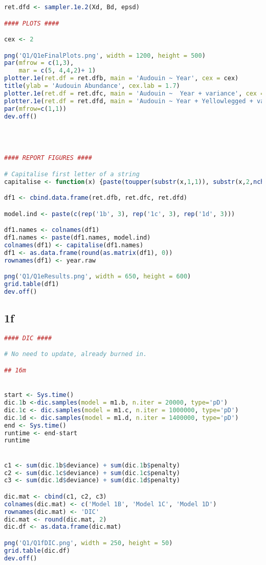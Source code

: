 \documentclass[11pt]{article}
\begin{document}
\begin{lstlisting}[language=R]
ret.dfd <- sampler.1e.2(Xd, Bd, epsd)  

#### PLOTS ####

cex <- 2

png('Q1/Q1eFinalPlots.png', width = 1200, height = 500)
par(mfrow = c(1,3), 
    mar = c(5, 4,4,2)+ 1)
plotter.1e(ret.df = ret.dfb, main = 'Audouin ~ Year', cex = cex)
title(ylab = 'Audouin Abundance', cex.lab = 1.7)
plotter.1e(ret.df = ret.dfc, main = 'Audouin ~  Year + variance', cex = cex)
plotter.1e(ret.df = ret.dfd, main = 'Audouin ~ Year + Yellowlegged + variance', cex = cex)
par(mfrow=c(1,1))
dev.off()




#### REPORT FIGURES ####

# Capitalise first letter of a string
capitalise <- function(x) {paste(toupper(substr(x,1,1)), substr(x,2,nchar(x)),sep='')}

df1 <- cbind.data.frame(ret.dfb, ret.dfc, ret.dfd)

model.ind <- paste(c(rep('1b', 3), rep('1c', 3), rep('1d', 3)))

df1.names <- colnames(df1)
df1.names <- paste(df1.names, model.ind)
colnames(df1) <- capitalise(df1.names)
df1 <- as.data.frame(round(as.matrix(df1), 0))
rownames(df1) <- year.raw

png('Q1/Q1eResults.png', width = 650, height = 600)
grid.table(df1)
dev.off()
\end{lstlisting}

\newpage
\subsection{1f} \label{appA1f}

\begin{lstlisting}[language=R]
#### DIC ####

# No need to update, already burned in. 

## 16m


start <- Sys.time()
dic.1b <-dic.samples(model = m1.b, n.iter = 20000, type='pD')
dic.1c <- dic.samples(model = m1.c, n.iter = 1000000, type='pD')
dic.1d <- dic.samples(model = m1.d, n.iter = 1400000, type='pD')
end <- Sys.time()
runtime <- end-start
runtime


c1 <- sum(dic.1b$deviance) + sum(dic.1b$penalty)
c2 <- sum(dic.1c$deviance) + sum(dic.1c$penalty)
c3 <- sum(dic.1d$deviance) + sum(dic.1d$penalty)

dic.mat <- cbind(c1, c2, c3)
colnames(dic.mat) <- c('Model 1B', 'Model 1C', 'Model 1D')
rownames(dic.mat) <- 'DIC'
dic.mat <- round(dic.mat, 2)
dic.df <- as.data.frame(dic.mat)

png('Q1/Q1fDIC.png', width = 250, height = 50)
grid.table(dic.df)
dev.off()
\end{lstlisting}
\end{document}
